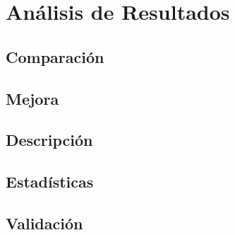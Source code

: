 \chapter{Análisis de Resultados}

\section{Comparación}
\section{Mejora}
\section{Descripción}
\section{Estadísticas}
\section{Validación}

\afterpage{\blankpage}